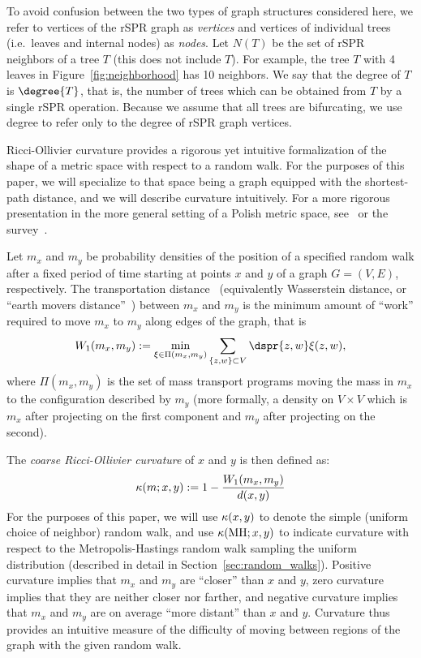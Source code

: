 \documentclass[11pt,onecolumn,conference]{IEEEtran}
\newcommand{\MH}{\operatorname{MH}}
\newcommand{\curvature}[2][]{%
    \ifthenelse{\equal{#1}{}}%
		{\kappa(#2)}%
		{\kappa_{#1}(#2)}%
}
\begin{document}
To avoid confusion between the two types of graph structures considered here, we refer to vertices of the rSPR graph as \emph{vertices} and vertices of individual trees (i.e.\ leaves and internal nodes) as \emph{nodes}.
Let $N(T)$ be the set of rSPR neighbors of a tree $T$ (this does not include $T$).
For example, the tree $T$ with 4 leaves in Figure~\ref{fig:neighborhood} has 10 neighbors.
We say that the degree of $T$ is $\degree{T}$, that is, the number of trees which can be obtained from $T$ by a single rSPR operation.
Because we assume that all trees are bifurcating, we use degree to refer only to the degree of rSPR graph vertices.

Ricci-Ollivier curvature provides a rigorous yet intuitive formalization of the shape of a metric space with respect to a random walk.
For the purposes of this paper, we will specialize to that space being a graph equipped with the shortest-path distance, and we will describe curvature intuitively.
For a more rigorous presentation in the more general setting of a Polish metric space, see~\cite{Ollivier2009-bw} or the survey~\cite{Ollivier2010-ao}.

Let $m_x$ and $m_y$ be probability densities of the position of a specified random walk after a fixed period of time starting at points $x$ and $y$ of a graph $G = (V,E)$, respectively.
The transportation distance~\cite{Villani2003-wv} (equivalently Wasserstein distance, or ``earth movers distance''~\cite{rubner2000earth}) between $m_x$ and $m_y$ is the minimum amount of ``work'' required to move $m_x$ to $m_y$ along edges of the graph, that is
$$ W_1(m_x, m_y) := \min_{\xi \in \Pi(m_x, m_y)} \sum_{\{z,w\} \subset V} \dspr{z,w} \xi(z,w),$$
where $\Pi(m_x, m_y)$ is the set of mass transport programs moving the mass in $m_x$ to the configuration described by $m_y$ (more formally, a density on $V \times V$ which is $m_x$ after projecting on the first component and $m_y$ after projecting on the second).

The \emph{coarse Ricci-Ollivier curvature} of $x$ and $y$ is then defined as:
\begin{equation}
\curvature{m; x, y} := 1 - \frac{W_1(m_x, m_y)}{d(x, y)}
\label{eq:curvatureDef}
\end{equation}
For the purposes of this paper, we will use $\curvature{x,y}$ to denote the simple (uniform choice of neighbor) random walk, and use $\curvature{\MH; x,y}$ to indicate curvature with respect to the Metropolis-Hastings random walk sampling the uniform distribution (described in detail in Section~\ref{sec:random_walks}).
Positive curvature implies that $m_x$ and $m_y$ are ``closer'' than $x$ and $y$, zero curvature implies that they are neither closer nor farther, and negative curvature implies that $m_x$ and $m_y$ are on average ``more distant'' than $x$ and $y$.
Curvature thus provides an intuitive measure of the difficulty of moving between regions of the graph with the given random walk.
\end{document}
